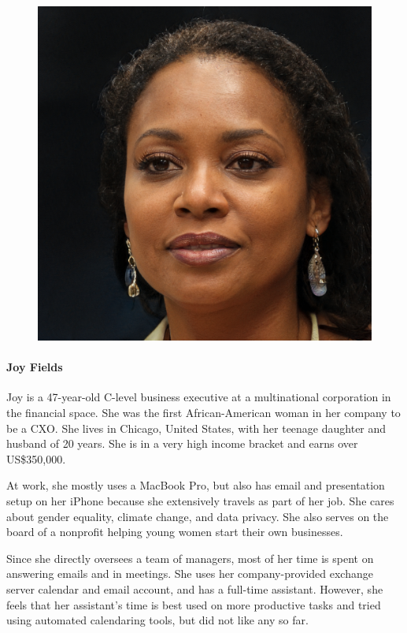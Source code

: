 \documentclass{article}
\begin{document}
\begin{figure}
	\includegraphics[scale=0.11]{persona-joy.jpg}
\end{figure}

\paragraph{Joy Fields}

Joy is a 47-year-old C-level business executive at a multinational corporation in the financial space. She was the first African-American woman in her company to be a CXO. She lives in Chicago, United States, with her teenage daughter and husband of 20 years. She is in a very high income bracket and earns over US\$350,000.

At work, she mostly uses a MacBook Pro, but also has email and presentation setup on her iPhone because she extensively travels as part of her job. She cares about gender equality, climate change, and data privacy. She also serves on the board of a nonprofit helping young women start their own businesses.

Since she directly oversees a team of managers, most of her time is spent on answering emails and in meetings. She uses her company-provided exchange server calendar and email account, and has a full-time assistant. However, she feels that her assistant's time is best used on more productive tasks and tried using automated calendaring tools, but did not like any so far.
\end{document}
